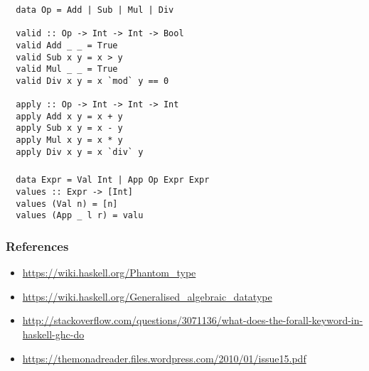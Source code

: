 \documentclass[aspectratio=43]{beamer}
\begin{document}
\begin{frame}[fragile]
 \frametitle{}
 \begin{lstlisting}
  data Op = Add | Sub | Mul | Div
  
  valid :: Op -> Int -> Int -> Bool 
  valid Add _ _ = True
  valid Sub x y = x > y
  valid Mul _ _ = True
  valid Div x y = x `mod` y == 0
  
  apply :: Op -> Int -> Int -> Int
  apply Add x y = x + y
  apply Sub x y = x - y
  apply Mul x y = x * y
  apply Div x y = x `div` y
  \end{lstlisting}
\end{frame}

\begin{frame}[fragile]
 \frametitle{}
 \begin{lstlisting}
  data Expr = Val Int | App Op Expr Expr
  values :: Expr -> [Int]
  values (Val n) = [n]
  values (App _ l r) = valu
 \end{lstlisting}
\end{frame}













\begin{frame}[fragile]
 \frametitle{References}
 \begin{itemize}
  \item \url{https://wiki.haskell.org/Phantom_type}
  \item \url{https://wiki.haskell.org/Generalised_algebraic_datatype}
  \item \url{http://stackoverflow.com/questions/3071136/what-does-the-forall-keyword-in-haskell-ghc-do}
  \item \url{https://themonadreader.files.wordpress.com/2010/01/issue15.pdf}
 \end{itemize}
\end{frame}
\end{document}
